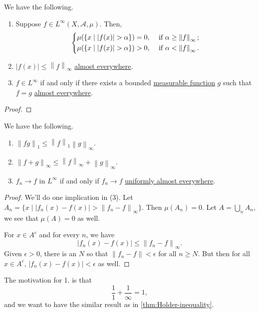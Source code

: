 \begin{lemma}
	We have the following.
	\begin{enumerate}[(1)]
		\item Suppose \(f\in L^{\infty} (X, \mathcal{A} , \mu )\). Then,
		      \[
			      \begin{dcases}
				      \mu (\{x\mid \left\vert f(x) \right\vert > \alpha \}) = 0, & \text{ if } \alpha \geq \left\lVert f\right\rVert _\infty; \\
				      \mu (\{x\mid \left\vert f(x) \right\vert > \alpha \}) > 0, & \text{ if } \alpha < \left\lVert f\right\rVert _\infty.    \\
			      \end{dcases}
		      \]
		\item \(\left\vert f(x) \right\vert \leq \left\lVert f\right\rVert _\infty \) \hyperref[def:mu-almost-everywhere]{almost everywhere}.
		\item \(f\in L^{\infty} \) if and only if there exists a bounded \hyperref[def:measurable-function]{measurable function} \(g\) such that \(f = g\) \hyperref[def:mu-almost-everywhere]{almost everywhere}.
	\end{enumerate}
\end{lemma}
\begin{proof}
\end{proof}

\begin{theorem}
	We have the following.
	\begin{enumerate}[(1)]
		\item \(\left\lVert fg\right\rVert _1 \leq \left\lVert f\right\rVert _1 \left\lVert g\right\rVert _\infty \).
		\item \(\left\lVert f + g\right\rVert _\infty \leq \left\lVert f\right\rVert _\infty + \left\lVert g\right\rVert _\infty \).
		\item \(f_{n} \to f\) in \(L^{\infty} \) if and only if \(f_{n} \to f\) \hyperref[def:uniformly-almost-everywhere]{uniformly almost everywhere}.
	\end{enumerate}
\end{theorem}
\begin{proof}
	We'll do one implication in (3). Let \(A_{n} = \{x\mid \left\vert f_{n} (x) - f(x) \right\vert > \left\lVert f_{n} - f\right\rVert_\infty  \}\).
	Then \(\mu (A_{n} ) = 0\). Let \(A = \bigcup_{n} A_{n} \), we see that \(\mu (A)= 0\) as well.

	For \(x\in A^{c} \) and for every \(n\), we have
	\[
		\left\vert f_{n} (x) - f(x) \right\vert \leq \left\lVert f_{n} - f\right\rVert _\infty .
	\]
	Given \(\epsilon >0\), there is an \(N\) so that \(\left\lVert f_{n} - f\right\rVert < \epsilon\) for all \(n\geq N\). But then for all
	\(x\in A^{c} \), \(\left\vert f_{n} (x) - f(x) \right\vert <\epsilon \) as well.
\end{proof}
\begin{remark}
	The motivation for 1. is that
	\[
		\frac{1}{1} + \frac{1}{\infty } = 1,
	\]
	and we want to have the similar result as in \autoref{thm:Holder-inequality}.
\end{remark}

